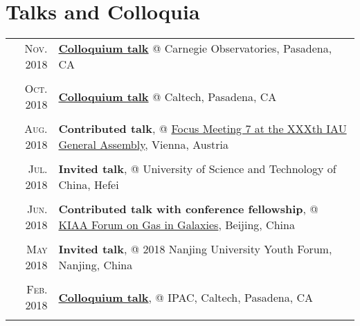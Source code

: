 \documentclass[letterpaper,10pt]{article}
\newcommand{\textwrap}{5.8in}       %
\begin{document}
\section{Talks and Colloquia}

\begingroup
\renewcommand\arraystretch{0.3}
\vspace*{-.5em}
\begin{longtable}{r|p{\textwrap}}

    \textsc{Nov. 2018}   &   \href{https://obs.carnegiescience.edu/content/tbd-108}{\textbf{Colloquium talk}} @ Carnegie Observatories, Pasadena, CA \\
    \multicolumn{2}{c}{} \\

    \textsc{Oct. 2018}   &   \href{http://www.astro.caltech.edu/events/tea_talks/tea_2018_2019/abstracts/wang.txt}{\textbf{Colloquium talk}} @ Caltech, Pasadena, CA \\
    \multicolumn{2}{c}{} \\

    \textsc{Aug. 2018}   &   \textbf{Contributed talk}, @ \href{http://www.arcetri.astro.it/fm7/programme.html}{Focus Meeting 7 at the XXXth IAU General Assembly}, Vienna, Austria \\
    \multicolumn{2}{c}{} \\

    \textsc{Jul. 2018}   &   \textbf{Invited talk}, @ University of Science and Technology of China, Hefei \\
    \multicolumn{2}{c}{} \\

    \textsc{Jun. 2018}   &   \textbf{Contributed talk with conference fellowship}, @ \href{http://kiaa.pku.edu.cn/gasingalaxies/?q=program}{KIAA Forum on Gas in Galaxies}, Beijing, China \\
    \multicolumn{2}{c}{} \\

    \textsc{May 2018}   &   \textbf{Invited talk}, @ 2018 Nanjing University Youth Forum, Nanjing, China \\
    \multicolumn{2}{c}{} \\

    \textsc{Feb. 2018}   &   \href{https://www.ipac.caltech.edu/event/358}{\textbf{Colloquium talk}}, @ IPAC, Caltech, Pasadena, CA \\
    \multicolumn{2}{c}{} \\


\end{longtable}
\end{document}
